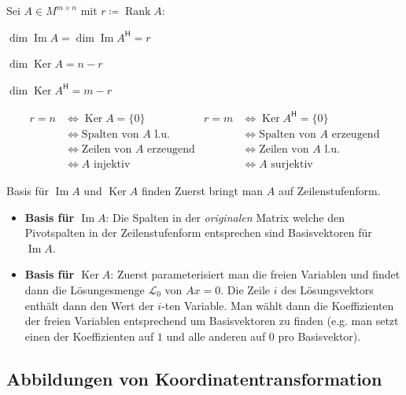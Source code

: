 \documentclass[a4paper,10pt]{article}
\DeclareMathOperator{\Rank}{Rank}
\DeclareMathOperator{\Image}{Im}
\DeclareMathOperator{\Kernel}{Ker}
\newcommand*{\hermconj}{\mathsf{H}}
\begin{document}
Sei $A \in M^{m \times n}$ mit $r \coloneqq \Rank A$:

\begin{rowlist}
  \item $\dim \Image A = \dim \Image A^\hermconj = r$
  \item $\dim \Kernel A = n - r$
  \item $\dim \Kernel A^\hermconj = m - r$
\end{rowlist}

\begin{align*}
  r = n & \Leftrightarrow \Kernel A = \{ 0 \} & r = m & \Leftrightarrow \Kernel A^\hermconj = \{ 0 \} \\
  & \Leftrightarrow \text{Spalten von $A$ l.u.} & & \Leftrightarrow \text{Spalten von $A$ erzeugend}\\
  & \Leftrightarrow \text{Zeilen von $A$ erzeugend} & & \Leftrightarrow \text{Zeilen von $A$ l.u.}\\
  & \Leftrightarrow A \text{ injektiv} & & \Leftrightarrow A \text{ surjektiv}
\end{align*}

\begin{subbox}{Basis für $\Image A$ und $\Kernel A$ finden}
  Zuerst bringt man $A$ auf Zeilenstufenform.
  \begin{itemize}
    \item \textbf{Basis für $\Image A$}: Die Spalten in der \textit{originalen} Matrix welche den Pivotspalten in der Zeilenstufenform entsprechen sind Basisvektoren für $\Image A$.
    \item \textbf{Basis für $\Kernel A$}: Zuerst parameterisiert man die freien Variablen und findet dann die Lösungesmenge $\mathcal{L}_0$ von $Ax = 0$. Die Zeile $i$ des Lösungsvektors enthält dann den Wert der $i$-ten Variable. Man wählt dann die Koeffizienten der freien Variablen entsprechend um Basisvektoren zu finden (e.g. man setzt einen der Koeffizienten auf $1$ und alle anderen auf $0$ pro Basisvektor). 
  \end{itemize}
\end{subbox}

\subsection{Abbildungen von Koordinatentransformation}
\end{document}
